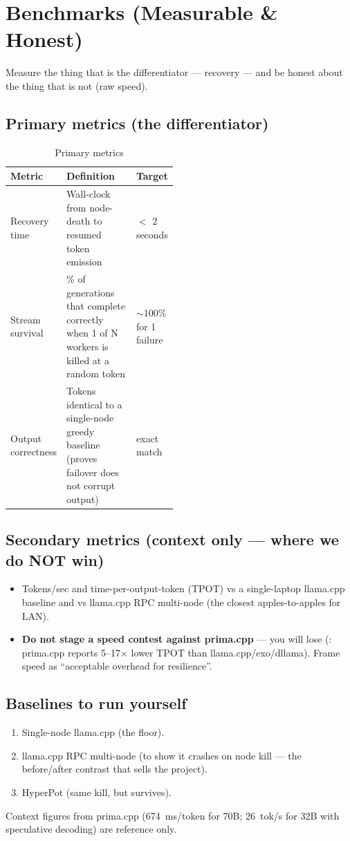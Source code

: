 \section{Benchmarks (Measurable \& Honest)}
\label{sec:benchmarks}

Measure the thing that is the differentiator --- recovery --- and be honest
about the thing that is not (raw speed).

\subsection{Primary metrics (the differentiator)}
\begin{table}[h]
\centering\footnotesize
\caption{Primary metrics}
\label{tab:primary}
\begin{tabularx}{\linewidth}{L{0.30\linewidth}Y L{0.18\linewidth}}
\toprule
Metric & Definition & Target \\
\midrule
Recovery time & Wall-clock from node-death to resumed token emission &
$<$ 2 seconds \\
Stream survival & \% of generations that complete correctly when 1 of N workers
is killed at a random token & $\sim$100\% for 1 failure \\
Output correctness & Tokens identical to a single-node greedy baseline (proves
failover does not corrupt output) & exact match \\
\bottomrule
\end{tabularx}
\end{table}

\subsection{Secondary metrics (context only --- where we do NOT win)}
\begin{itemize}[leftmargin=1.4em,nosep]
  \item Tokens/sec and time-per-output-token (TPOT) vs a single-laptop llama.cpp
  baseline and vs llama.cpp RPC multi-node (the closest apples-to-apples for LAN).
  \item \textbf{Do not stage a speed contest against prima.cpp} --- you will lose
  (\VER: prima.cpp reports 5--17$\times$ lower TPOT than llama.cpp/exo/dllama).
  Frame speed as ``acceptable overhead for resilience''.
\end{itemize}

\subsection{Baselines to run yourself}
\begin{enumerate}[leftmargin=1.6em,nosep]
  \item Single-node llama.cpp (the floor).
  \item llama.cpp RPC multi-node (to show it crashes on node kill --- the
  before/after contrast that sells the project).
  \item HyperPot (same kill, but survives).
\end{enumerate}
Context figures from prima.cpp (674~ms/token for 70B; 26~tok/s for 32B with
speculative decoding) are reference only. \VER
